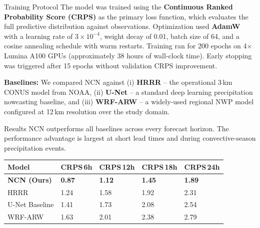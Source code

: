 \documentclass{article}
\newcommand{\sectionicon}[1]{\makebox[1.3em][l]{#1}}
\begin{document}
\hfill%
\begin{minipage}[t]{0.485\textwidth}

\begin{posterblock}{\sectionicon{\faFlask} Training Protocol}
The model was trained using the \textbf{Continuous Ranked Probability Score (CRPS)} as the primary loss function, which evaluates the full predictive distribution against observations. Optimization used \textbf{AdamW} with a learning rate of $3\times10^{-4}$, weight decay of 0.01, batch size of 64, and a cosine annealing schedule with warm restarts. Training ran for 200 epochs on 4$\times$ Lumina A100 GPUs (approximately 38 hours of wall-clock time). Early stopping was triggered after 15 epochs without validation CRPS improvement.

\vspace{4pt}
\textbf{Baselines:} We compared NCN against (i) \textbf{HRRR} -- the operational 3\,km CONUS model from NOAA, (ii) \textbf{U-Net} -- a standard deep learning precipitation nowcasting baseline, and (iii) \textbf{WRF-ARW} -- a widely-used regional NWP model configured at 12\,km resolution over the study domain.
\end{posterblock}

\begin{posterblock}{\sectionicon{\faChartBar} Results}
NCN outperforms all baselines across every forecast horizon. The performance advantage is largest at short lead times and during convective-season precipitation events.

\vspace{4pt}
\begin{tcolorbox}[enhanced,colback=white,colframe=softgray,arc=1.5mm,boxrule=0.3mm,top=2mm,bottom=2mm,left=3mm,right=3mm]
\footnotesize
\begin{tabularx}{\linewidth}{lXXXX}
\toprule
\bfseries Model & \bfseries CRPS\,6h & \bfseries CRPS\,12h & \bfseries CRPS\,18h & \bfseries CRPS\,24h \\
\midrule
\textbf{NCN (Ours)}      & \textbf{0.87} & \textbf{1.12} & \textbf{1.45} & \textbf{1.89} \\{}
HRRR                     & 1.24 & 1.58 & 1.92 & 2.31 \\{}
U-Net Baseline           & 1.41 & 1.73 & 2.08 & 2.54 \\{}
WRF-ARW                  & 1.63 & 2.01 & 2.38 & 2.79 \\
\bottomrule
\end{tabularx}
\vspace{2pt}
\begin{center}
\end{center}
\end{tcolorbox}


\end{posterblock}
\end{minipage}
\end{document}
